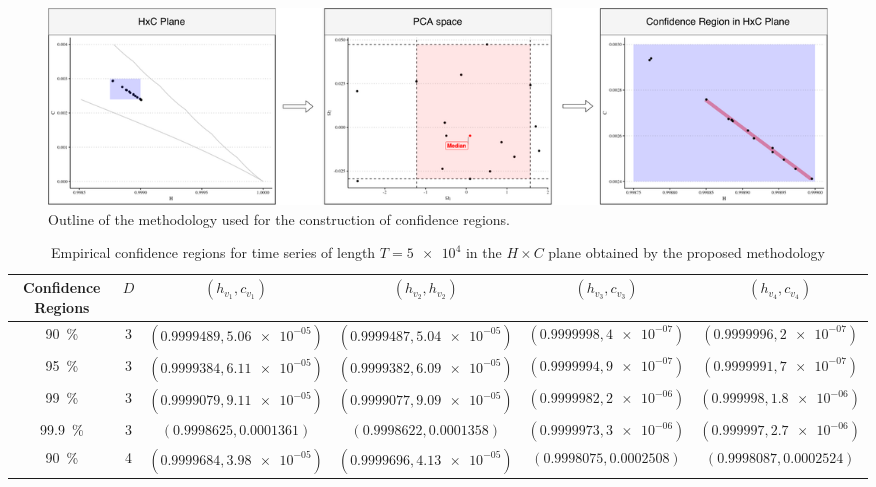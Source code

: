 \begin{figure}[H]
    \centering
    \includegraphics[width=\linewidth]{Figures/methodology.pdf}
    \caption{Outline of the methodology used for the construction of confidence regions.}
    \label{fig:methodology}
\end{figure}

\begin{table}
    \caption{Empirical confidence regions for time series of length $T = \num[scientific-notation=true]{5 e4}$ in the $H \times C$ plane obtained by the proposed methodology}
    \label{Tab:Regions50k}
    \centering
    \begin{tabular}{cccccc}
    \toprule
Confidence Regions & $D$ & $(h_{v_1}, c_{v_1})$ & $(h_{v_2}, h_{v_2})$ & $(h_{v_3}, c_{v_3})$ & $(h_{v_4},c_{v_4})$\\ 
\midrule
\SI{90}{\percent} & 3 & $(0.9999489, \num[scientific-notation=true]{5.06e-05})$ & $(0.9999487, \num[scientific-notation=true]{5.04e-05})$ & $(0.9999998, \num[scientific-notation=true]{4e-07})$ & $(0.9999996, \num[scientific-notation=true]{2e-07})$\\
\SI{95}{\percent} & 3 & $(0.9999384, \num[scientific-notation=true]{6.11e-05})$ & $(0.9999382, \num[scientific-notation=true]{6.09e-05})$ & $(0.9999994, \num[scientific-notation=true]{9e-07})$ & $(0.9999991, \num[scientific-notation=true]{7e-07})$\\
\SI{99}{\percent} & 3 & $(0.9999079, \num[scientific-notation=true]{9.11e-05})$ & $(0.9999077, \num[scientific-notation=true]{9.09e-05})$ & $(0.9999982, \num[scientific-notation=true]{2e-06})$ & $(0.999998, \num[scientific-notation=true]{1.8e-06})$\\
\SI{99.9}{\percent} & 3 & $(0.9998625, 0.0001361)$ & $(0.9998622, 0.0001358)$ & $(0.9999973, \num[scientific-notation=true]{3e-06})$ & $(0.999997, \num[scientific-notation=true]{2.7e-06})$\\
\cmidrule(lr){1-6}
\SI{90}{\percent} & 4 & $(0.9999684, \num[scientific-notation=true]{3.98e-05})$ & $(0.9999696, \num[scientific-notation=true]{4.13e-05})$ & $(0.9998075, 0.0002508)$ & $(0.9998087, 0.0002524)$\\

\end{tabular}
\end{table}
